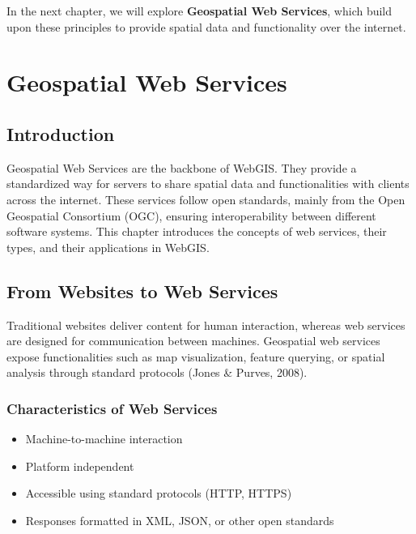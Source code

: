 \documentclass[
  11pt,
  letterpaper,
]{book}
\providecommand{\tightlist}{%
  \setlength{\itemsep}{0pt}\setlength{\parskip}{0pt}}
\begin{document}
In the next chapter, we will explore \textbf{Geospatial Web Services},
which build upon these principles to provide spatial data and
functionality over the internet.

\chapter{Geospatial Web Services}\label{geospatial-web-services}

\section{Introduction}\label{introduction-3}

Geospatial Web Services are the backbone of WebGIS. They provide a
standardized way for servers to share spatial data and functionalities
with clients across the internet. These services follow open standards,
mainly from the Open Geospatial Consortium (OGC), ensuring
interoperability between different software systems. This chapter
introduces the concepts of web services, their types, and their
applications in WebGIS.

\section{From Websites to Web
Services}\label{from-websites-to-web-services}

Traditional websites deliver content for human interaction, whereas web
services are designed for communication between machines. Geospatial web
services expose functionalities such as map visualization, feature
querying, or spatial analysis through standard protocols (Jones \&
Purves, 2008).

\subsection{Characteristics of Web
Services}\label{characteristics-of-web-services}

\begin{itemize}
\tightlist
\item
  Machine-to-machine interaction\\
\item
  Platform independent\\
\item
  Accessible using standard protocols (HTTP, HTTPS)\\
\item
  Responses formatted in XML, JSON, or other open standards
\end{itemize}
\end{document}
